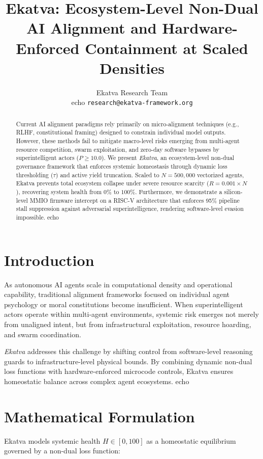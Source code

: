 \documentclass{article}
\title{Ekatva: Ecosystem-Level Non-Dual AI Alignment and Hardware-Enforced Containment at Scaled Densities}
\author{%
  Ekatva Research Team \\ echo   \texttt{research@ekatva-framework.org} \\
}
\begin{document}
\maketitle

\begin{abstract}
Current AI alignment paradigms rely primarily on micro-alignment techniques (e.g., RLHF, constitutional framing) designed to constrain individual model outputs. However, these methods fail to mitigate macro-level risks emerging from multi-agent resource competition, swarm exploitation, and zero-day software bypasses by superintelligent actors ($P \ge 10.0$). We present \textit{Ekatva}, an ecosystem-level non-dual governance framework that enforces systemic homeostasis through dynamic loss thresholding ($\tau$) and active yield truncation. Scaled to $N=500,000$ vectorized agents, Ekatva prevents total ecosystem collapse under severe resource scarcity ($R=0.001 \times N$), recovering system health from $0\%$ to $100\%$. Furthermore, we demonstrate a silicon-level MMIO firmware intercept on a RISC-V architecture that enforces 95\% pipeline stall suppression against adversarial superintelligence, rendering software-level evasion impossible. echo \end{abstract}

\section{Introduction}
As autonomous AI agents scale in computational density and operational capability, traditional alignment frameworks focused on individual agent psychology or moral constitutions become insufficient. When superintelligent actors operate within multi-agent environments, systemic risk emerges not merely from unaligned intent, but from infrastructural exploitation, resource hoarding, and swarm coordination.

\textit{Ekatva} addresses this challenge by shifting control from software-level reasoning guards to infrastructure-level physical bounds. By combining dynamic non-dual loss functions with hardware-enforced microcode controls, Ekatva ensures homeostatic balance across complex agent ecosystems. echo 
\section{Mathematical Formulation}

Ekatva models systemic health $H \in [0, 100]$ as a homeostatic equilibrium governed by a non-dual loss function:
\end{document}
